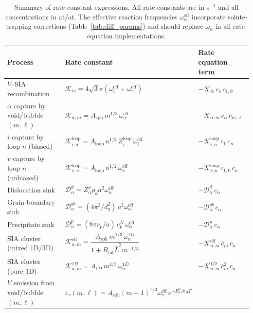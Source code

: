 \documentclass[pdflatex,sn-basic]{sn-jnl} %
\begin{document}
\begin{table}[htbp]
\centering
\caption{Summary of rate constant expressions. All rate constants are in
s$^{-1}$ and all concentrations in at/at. The effective reaction frequencies
$\omega_\alpha^{\mathrm{eff}}$ incorporate solute-trapping corrections
(Table~\ref{tab:diff_params}) and should replace $\omega_\alpha$ in all
rate-equation implementations.}
\label{tab:rate_summary}
\renewcommand{\arraystretch}{1.3}
\begin{tabular}{@{}lll@{}}
\toprule
\textbf{Process} & \textbf{Rate constant} & \textbf{Rate equation term} \\
\midrule
$V$--SIA recombination
  & $\mathcal{K}_{iv} = 4\sqrt{3}\pi(\omega_i^{\mathrm{eff}}+\omega_v^{\mathrm{eff}})$
  & $-\mathcal{K}_{iv}\,c_1\,c_{1,0}$ \\[3pt]
$\alpha$ capture by void/bubble $(m,\ell)$
  & $\mathcal{K}_{\alpha,m} = A_{\mathrm{sph}}\,m^{1/3}\,\omega_\alpha^{\mathrm{eff}}$
  & $-\mathcal{K}_{\alpha,m}\,c_\alpha\,c_{m,\ell}$ \\[3pt]
$i$ capture by loop $n$ (biased)
  & $\mathcal{K}_{i,n}^{\mathrm{loop}} = A_{\mathrm{loop}}\,n^{1/2}\,Z_i^{\mathrm{loop}}\,\omega_i^{\mathrm{eff}}$
  & $-\mathcal{K}_{i,n}^{\mathrm{loop}}\,c_1\,c_n$ \\[3pt]
$v$ capture by loop $n$ (unbiased)
  & $\mathcal{K}_{v,n}^{\mathrm{loop}} = A_{\mathrm{loop}}\,n^{1/2}\,\omega_v^{\mathrm{eff}}$
  & $-\mathcal{K}_{v,n}^{\mathrm{loop}}\,c_{1,0}\,c_n$ \\[3pt]
Dislocation sink
  & $\mathcal{D}_\alpha^d = Z_\alpha^d\rho_d a^2\omega_\alpha^{\mathrm{eff}}$
  & $-\mathcal{D}_\alpha^d\,c_\alpha$ \\[3pt]
Grain-boundary sink
  & $\mathcal{D}_\alpha^{gb} = (4\pi^2/d_g^2)\,a^2\omega_\alpha^{\mathrm{eff}}$
  & $-\mathcal{D}_\alpha^{gb}\,c_\alpha$ \\[3pt]
Precipitate sink
  & $\mathcal{D}_\alpha^p = (8\pi r_p/a)\,c_p^N\,\omega_\alpha^{\mathrm{eff}}$
  & $-\mathcal{D}_\alpha^p\,c_\alpha$ \\[3pt]
SIA cluster (mixed 1D/3D)
  & $\mathcal{K}_{n,m}^{\mathrm{eff}} = \dfrac{A_{\mathrm{sph}}\,m^{1/3}\,\omega_n^{1D}}
    {1 + B_{\mathrm{rot}}\hat{L}^2 m^{-1/3}}$
  & $-\mathcal{K}_{n,m}^{\mathrm{eff}}\,\bar{c}_m\,c_n$ \\[6pt]
SIA cluster (pure 1D)
  & $\mathcal{K}_{n,m}^{1D} = A_{1D}\,m^{4/3}\,\omega_n^{1D}$
  & $-\mathcal{K}_{n,m}^{1D}\,\bar{c}_m^2\,c_n$ \\[3pt]
$V$ emission from void/bubble $(m,\ell)$
  & $\varepsilon_v(m,\ell)=A_{\mathrm{sph}}(m-1)^{1/3}\omega_v^{\mathrm{eff}}\,e^{-E_b^v/k_BT}$

\end{tabular}
\end{table}
\end{document}
